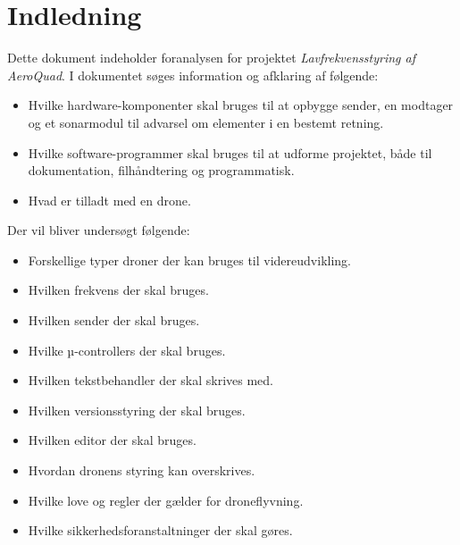 \documentclass[Main]{subfiles}
\begin{document}
\chapter{Indledning}
Dette dokument indeholder foranalysen for projektet \textit{Lavfrekvensstyring af AeroQuad}.
I dokumentet søges information og afklaring af følgende:
\begin{itemize}
\item Hvilke hardware-komponenter skal bruges til at opbygge sender, en modtager og et sonarmodul til advarsel om elementer i en bestemt retning.
\item Hvilke software-programmer skal bruges til at udforme projektet, både til dokumentation, filhåndtering og programmatisk.
\item Hvad er tilladt med en drone.
\end{itemize}

Der vil bliver undersøgt følgende:
\begin{itemize}
\item Forskellige typer droner der kan bruges til videreudvikling.
\item Hvilken frekvens der skal bruges.
\item Hvilken sender der skal bruges.
\item Hvilke µ-controllers der skal bruges.
\item Hvilken tekstbehandler der skal skrives med.
\item Hvilken versionsstyring der skal bruges.
\item Hvilken editor der skal bruges.
\item Hvordan dronens styring kan overskrives.
\item Hvilke love og regler der gælder for droneflyvning.
\item Hvilke sikkerhedsforanstaltninger der skal gøres.
\end{itemize}
\end{document}
